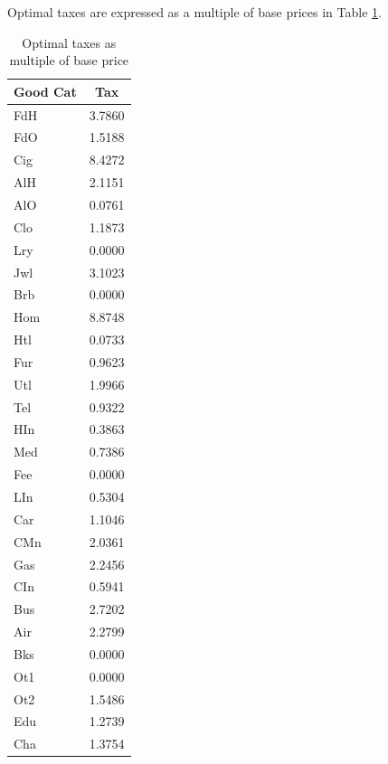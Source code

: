 \documentclass{article}
\begin{document}
Optimal taxes are expressed as a multiple of base prices in Table \ref{tab:opttax}.
\begin{table}
	\begin{center}
		\begin{tabular}{|l|c|}
			\hline
			\textbf{Good Cat} & \textbf{Tax} \\
			\hline
			FdH &  3.7860\\
			\hline
			FdO &  1.5188\\ 
			\hline
			Cig &  8.4272\\ 
			\hline
			AlH &  2.1151\\ 
			\hline
			AlO &  0.0761\\ 
			\hline
			Clo &  1.1873\\ 
			\hline
			Lry &  0.0000\\ 
			\hline
			Jwl &  3.1023\\ 
			\hline
			Brb &  0.0000\\ 
			\hline
			Hom &  8.8748\\ 
			\hline
			Htl &  0.0733\\ 
			\hline
			Fur &  0.9623\\ 
			\hline
			Utl &  1.9966\\ 
			\hline
			Tel &  0.9322\\ 
			\hline
			HIn &  0.3863\\ 
			\hline
			Med &  0.7386\\ 
			\hline
			Fee &  0.0000\\ 
			\hline
			LIn &  0.5304\\ 
			\hline
			Car &  1.1046\\ 
			\hline
			CMn &  2.0361\\ 
			\hline
			Gas &  2.2456\\ 
			\hline
			CIn &  0.5941\\ 
			\hline
			Bus &  2.7202\\ 
			\hline
			Air &  2.2799\\ 
			\hline
			Bks &  0.0000\\ 
			\hline
			Ot1 &  0.0000\\ 
			\hline
			Ot2 &  1.5486\\ 
			\hline
			Edu &  1.2739\\ 
			\hline
			Cha &  1.3754\\ 
			\hline
		\end{tabular}
	\end{center}
	\caption{Optimal taxes as multiple of base price}
	\label{tab:opttax}
\end{table}
\end{document}
